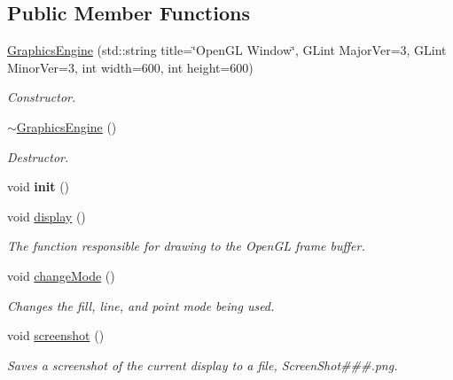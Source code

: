 \subsection*{Public Member Functions}
\begin{DoxyCompactItemize}
\item 
\hyperlink{class_graphics_engine_a458fa2b36f864e0820a0a54ad58ff1c3}{Graphics\+Engine} (std\+::string title=\char`\"{}Open\+GL Window\char`\"{}, G\+Lint Major\+Ver=3, G\+Lint Minor\+Ver=3, int width=600, int height=600)
\begin{DoxyCompactList}\small\item\em Constructor. \end{DoxyCompactList}\item 
\hyperlink{class_graphics_engine_ab67afeefbc9f1c284f6ce310c31ae8f6}{$\sim$\+Graphics\+Engine} ()
\begin{DoxyCompactList}\small\item\em Destructor. \end{DoxyCompactList}\item 
\mbox{\label{class_graphics_engine_a788be2ee3b219fe44ca484a9a4e3d21f}} 
void {\bfseries init} ()
\item 
void \hyperlink{class_graphics_engine_a2f0bdf1a47bf9e8d4f1c9525c2ebc8f9}{display} ()
\begin{DoxyCompactList}\small\item\em The function responsible for drawing to the Open\+GL frame buffer. \end{DoxyCompactList}\item 
\mbox{\label{class_graphics_engine_a7f549d3ad00c34e61d067fdd2a911034}} 
void \hyperlink{class_graphics_engine_a7f549d3ad00c34e61d067fdd2a911034}{change\+Mode} ()
\begin{DoxyCompactList}\small\item\em Changes the fill, line, and point mode being used. \end{DoxyCompactList}\item 
\mbox{\label{class_graphics_engine_a7b12982b41cbdb107f48863798be2ed7}} 
void \hyperlink{class_graphics_engine_a7b12982b41cbdb107f48863798be2ed7}{screenshot} ()
\begin{DoxyCompactList}\small\item\em Saves a screenshot of the current display to a file, Screen\+Shot\#\#\#.png. \end{DoxyCompactList}\item 

\end{DoxyCompactItemize}
